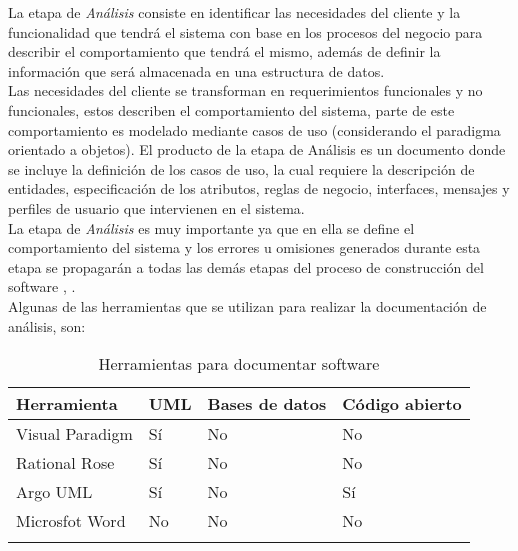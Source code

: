 La etapa de {\it Análisis} consiste en identificar las necesidades del cliente y la funcionalidad que tendrá el sistema con base en los procesos del negocio para describir el comportamiento que tendrá el mismo, además de definir la información que será almacenada en una estructura de datos. \\

Las necesidades del cliente se transforman en requerimientos funcionales y no funcionales, estos describen el comportamiento del sistema, parte de este comportamiento es modelado mediante casos de uso (considerando el paradigma orientado a objetos). El producto de la etapa de Análisis es un documento donde se incluye la definición de los casos de uso, la cual requiere la descripción de entidades, especificación de los atributos,  reglas de negocio, interfaces, mensajes y perfiles de usuario que intervienen en el sistema.\\

La etapa de {\it Análisis} es muy importante ya que en ella se define el comportamiento del sistema y los errores u omisiones generados durante esta etapa se propagarán a todas las demás etapas del proceso de construcción del software \cite{sommerville1992software}, \cite{kendall2005analisis}.\\


Algunas de las herramientas que se utilizan para realizar la documentación de análisis, son:

\begin{longtable}{| p{} | p{} | p{} | p{} |}%
	\arrayrulecolor{black}%
	\rowcolor{black}%
	{\color{white}Herramienta} & {\color{white}UML} & {\color{white}Bases de datos} & {\color{white}Código abierto}\\ \hline
	\endhead%
	\arrayrulecolor{black}%
	Visual Paradigm & Sí & No & No\\ \hline
	Rational Rose & Sí & No & No\\ \hline
	Argo UML &  Sí & No & Sí\\ \hline
	Microsfot Word &  No & No & No\\ \hline
	\caption{Herramientas para documentar software}\label{fig:tablaAnalisis}
\end{longtable}%





